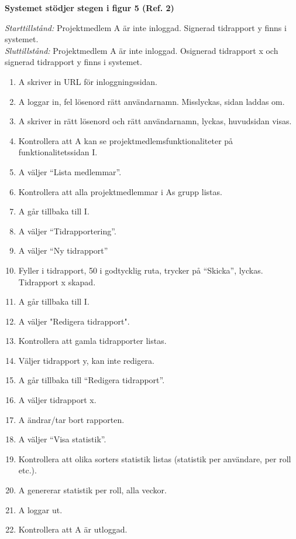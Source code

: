 \documentclass[a4paper]{article}
\begin{document}
\begin{ST}
\item
\textbf{Systemet stödjer stegen i figur 5 (Ref. 2)} 

\emph{Starttillstånd:} Projektmedlem A är inte inloggad. Signerad tidrapport y finns i systemet. \\
\emph{Sluttillstånd:} Projektmedlem A är inte inloggad. Osignerad tidrapport x och signerad tidrapport y finns i systemet.\\

\begin{enumerate}

\item A skriver in URL för inloggningssidan.
\item A loggar in, fel lösenord rätt användarnamn. Misslyckas, sidan laddas om.
\item A skriver in rätt lösenord och rätt användarnamn, lyckas, huvudsidan visas.
\item Kontrollera att A kan se projektmedlemsfunktionaliteter på funktionalitetssidan I.\\
\item A väljer ``Lista medlemmar''.
\item Kontrollera att alla projektmedlemmar i As grupp listas.
\item A går tillbaka till I.
\item A väljer ``Tidrapportering''.
\item A väljer ``Ny tidrapport''
\item Fyller i tidrapport, 50 i godtycklig ruta, trycker på ``Skicka'', lyckas. Tidrapport x skapad.
\item A går tillbaka till I.
\item A väljer "Redigera tidrapport".
\item Kontrollera att gamla tidrapporter listas.
\item Väljer tidrapport y, kan inte redigera.
\item A går tillbaka till ``Redigera tidrapport''.
\item A väljer tidrapport x.
\item A ändrar/tar bort rapporten.
\item A väljer ``Visa statistik''.
\item Kontrollera att olika sorters statistik listas (statistik per användare, per roll etc.).\\
\item A genererar statistik per roll, alla veckor.
\item A loggar ut.
\item Kontrollera att A är utloggad.

\end {enumerate}



\end{ST}
\end{document}
